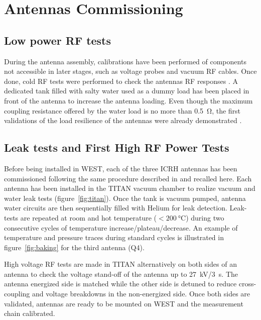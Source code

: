 \documentclass[12p]{iopart}
\begin{document}
\section{Antennas Commissioning}
\subsection{Low power RF tests}
During the antenna assembly, calibrations have been performed of components not accessible in later stages, such as voltage probes and vacuum RF cables. Once done, cold RF tests were performed to check the antennas RF responses \cite{bernard2019, helou2020}. A dedicated tank filled with salty water used as a dummy load has been placed in front of the antenna to increase the antenna loading. Even though the maximum coupling resistance offered by the water load is no more than \SI{0.5}{\ohm}, the first validations of the load resilience of the antennas were already demonstrated \cite{helou2020}. 

\subsection{Leak tests and First High RF Power Tests}
Before being installed in WEST, each of the three ICRH antennas has been commissioned following the same procedure described in \cite{bernard2019} and recalled here. Each antenna has been installed in the TITAN vacuum chamber to realize vacuum and water leak tests (figure~\ref{fig:titan}). Once the tank is vacuum pumped, antenna water circuits are then sequentially filled with Helium for leak detection. Leak-tests are repeated at room and hot temperature ($<\SI{200}{\celsius}$) during two consecutive cycles of temperature increase/plateau/decrease. An example of temperature and pressure traces during standard cycles is illustrated in figure~\ref{fig:baking} for the third antenna (Q4).  

High voltage RF tests are made in TITAN alternatively on both sides of an antenna to check the voltage stand-off of the antenna up to \SI{27}{\kilo\volt}/\SI{3}{\second}. The antenna energized side is matched while the other side is detuned to reduce cross-coupling and voltage breakdowns in the non-energized side. Once both sides are validated, antennas are ready to be mounted on WEST and the measurement chain calibrated.
\end{document}
